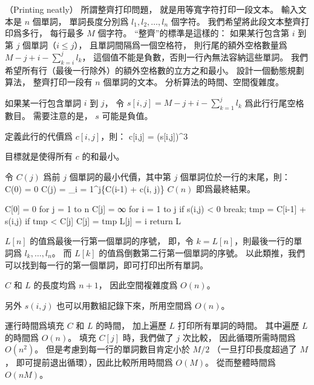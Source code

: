 \startPROBLEM
（Printing neatly）
所謂整齊打印問題，
就是用等寬字符打印一段文本。
輸入文本是 $n$ 個單詞，
單詞長度分別爲 $l_1,l_2,\ldots,l_n$ 個字符。
我們希望將此段文本整齊打印爲多行，
每行最多 $M$ 個字符。
“整齊”的標準是這樣的：
如果某行包含第 $i$ 到第 $j$ 個單詞（$i\le j$），
且單詞間隔爲一個空格符，
則行尾的額外空格數量爲 $M-j+i-\sum_{k=i}^{j}l_k$，
這個值不能是負數，否則一行內無法容納這些單詞。
我們希望所有行（最後一行除外）的額外空格數的立方之和最小。
設計一個動態規劃算法，
整齊打印一段有 $n$ 個單詞的文本。
分析算法的時間、空間復雜度。
\stopPROBLEM

\startANSWER
如果某一行包含單詞 $i$ 到 $j$，
令 $s[i,j] = M - j + i - \sum_{k=1}^{j}l_k$ 爲此行行尾空格數目。
需要注意的是， $s$ 可能是負值。

定義此行的代價爲 $c[i,j]$，則：
\startformula
c[i,j] = \startcases
\NC \infty \NC {} \NR
{} \NC {} \NR
\NC (s[i,j])^3 \NC {} \NR
\stopcases
\stopformula

目標就是使得所有 $c$ 的和最小。

令 $C(j)$ 爲前 $j$ 個單詞的最小代價，其中第 $j$ 個單詞位於一行的末尾，則：
\startformula\startmathalignment
\NC C(0) \NC = 0 \NR
\NC C(j) \NC = \min_{i = 1}^{j}\{C(i-1) + c(i, j)\} \NR
\stopmathalignment\stopformula
$C(n)$ 即爲最終結果。

\startCLRSCODE
C[0] = 0
for j = 1 to n
	C[j] = ∞
	for i = 1 to j
		if s(i,j) < 0
			break;
		tmp = C[i-1] + s(i,j)
		if tmp < C[j]
			C[j] = tmp
			L[j] = i
return L
\stopCLRSCODE

$L[n]$ 的值爲最後一行第一個單詞的序號，
即，令 $k=L[n]$，則最後一行的單詞爲 $l_k,\ldots, l_n$。
而 $L[k]$ 的值爲倒數第二行第一個單詞的序號。
以此類推，我們可以找到每一行的第一個單詞，即可打印出所有單詞。

$C$ 和 $L$ 的長度均爲 $n+1$，
因此空間複雜度爲 $O(n)$。

另外 $s(i,j)$ 也可以用數組記錄下來，所用空間爲 $O(n)$。

運行時間爲填充 $C$ 和 $L$ 的時間，
加上遍歷 $L$ 打印所有單詞的時間。
其中遍歷 $L$ 的時間爲 $O(n)$。
填充 $C[j]$ 時，我們做了 $j$ 次比較，
因此循環所需時間爲 $O(n^2)$。
但是考慮到每一行的單詞數目肯定小於 $M/2$ （一旦打印長度超過了 $M$，
即可提前退出循環），因此比較所用時間爲 $O(M)$。
從而整體時間爲 $O(nM)$。
\stopANSWER
